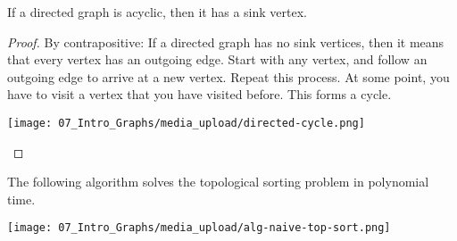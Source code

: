 \begin{flex}
\begin{lemma}
If a directed graph is acyclic, then it has a sink vertex.
\end{lemma}

\begin{proof}
By contrapositive: If a directed graph has no sink vertices, then it means that every vertex has an outgoing edge. Start with any vertex, and follow an outgoing edge to arrive at a new vertex. Repeat this process. At some point, you have to visit a vertex that you have visited before. This forms a cycle.
\begin{center}
    \texttt{[image: 07\_Intro\_Graphs/media\_upload/directed-cycle.png]}
\end{center}
\end{proof}
\end{flex}


\begin{note}
The following algorithm solves the topological sorting problem in polynomial time.
\begin{center}
    \texttt{[image: 07\_Intro\_Graphs/media\_upload/alg-naive-top-sort.png]}
\end{center}
\end{note}


